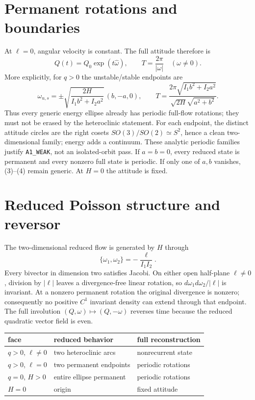 \documentclass[10pt]{article}
\begin{document}
\section{Permanent rotations and boundaries}
At $\ell=0$, angular velocity is constant.  The full attitude therefore is
\[
 Q(t)=Q_0\exp(t\widehat\omega),\qquad
 T=\frac{2\pi}{|\omega|}\quad(\omega\ne0). \tag{5}
\]
More explicitly, for $q>0$ the unstable/stable endpoints are
\[
 \omega_{u,s}=\pm\sqrt{\frac{2H}{I_1b^2+I_2a^2}}\,(b,-a,0),\qquad
 T=\frac{2\pi\sqrt{I_1b^2+I_2a^2}}
 {\sqrt{2H}\sqrt{a^2+b^2}}. \tag{6}
\]
Thus every generic energy ellipse already has periodic full-flow rotations;
they must not be erased by the heteroclinic statement.  For each endpoint,
the distinct attitude circles are the right cosets
$SO(3)/SO(2)\simeq S^2$, hence a clean two-dimensional family; energy adds a
continuum.  These analytic periodic families justify \texttt{A1\_WEAK}, not
an isolated-orbit pass.  If $a=b=0$, every reduced state is permanent and
every nonzero full state is periodic.  If only one of $a,b$ vanishes,
(3)--(4) remain generic.  At $H=0$ the attitude is fixed.
\section{Reduced Poisson structure and reversor}
The two-dimensional reduced flow is generated by $H$ through
\[
 \{\omega_1,\omega_2\}=-\frac{\ell}{I_1I_2}. \tag{7}
\]
Every bivector in dimension two satisfies Jacobi.  On either open half-plane
$\ell\ne0$, division by $|\ell|$ leaves a divergence-free linear rotation,
so $d\omega_1d\omega_2/|\ell|$ is invariant.  At a nonzero permanent
rotation the original divergence is nonzero; consequently no positive
$C^1$ invariant density can extend through that endpoint.  The full
involution $(Q,\omega)\mapsto(Q,-\omega)$ reverses time because the reduced
quadratic vector field is even.
\begin{center}
\small
\begin{tabular}{lll}
\toprule
face & reduced behavior & full reconstruction\\
\midrule
$q>0$, $\ell\ne0$ & two heteroclinic arcs & nonrecurrent state\\
$q>0$, $\ell=0$ & two permanent endpoints & periodic rotations\\
$q=0$, $H>0$ & entire ellipse permanent & periodic rotations\\
$H=0$ & origin & fixed attitude\\
\bottomrule
\end{tabular}
\end{center}
\end{document}
